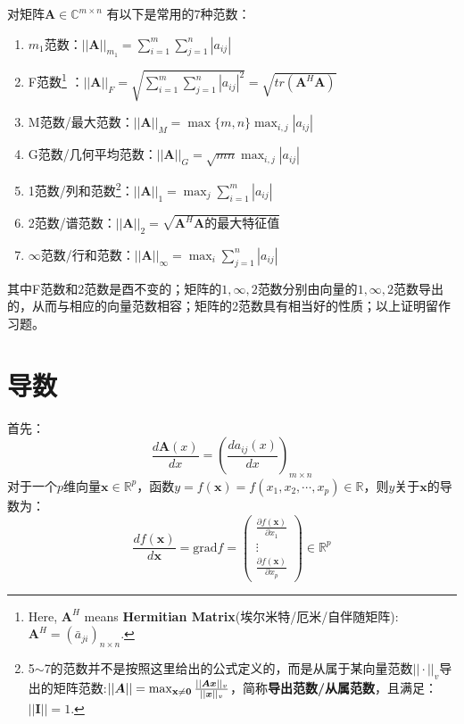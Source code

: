 \documentclass[11pt,fleqn, UTF8]{ctexbook} %
\begin{document}
对矩阵$\boldsymbol{A}\in \mathbb{C}^{m\times n}$ 有以下是常用的7种范数：
\begin{enumerate}
  \item $m_1$范数：$||\boldsymbol{A}||_{m_1}=\sum_{i=1}^{m}\sum_{j=1}^{n}|a_{ij}|$
  \item F范数\footnote{
  Here, $\boldsymbol{A}^H$ means \textbf{Hermitian Matrix}(埃尔米特/厄米/自伴随矩阵): $\boldsymbol{A}^H=(\bar{a}_{ji})_{n\times n}$.
  }
  ：$||\boldsymbol{A}||_F=\sqrt{\sum_{i=1}^{m}\sum_{j=1}^{n}|a_{ij}|^2}=\sqrt{tr(\boldsymbol{A}^H\boldsymbol{A})}$
  \item M范数/最大范数：$||\boldsymbol{A}||_M=\max\{m,n\}\max_{i,j}|a_{ij}|$
  \item G范数/几何平均范数：$||\boldsymbol{A}||_G=\sqrt{mn}\max_{i,j}|a_{ij}|$
  \item 1范数/列和范数\footnote{
  5$\sim$7的范数并不是按照这里给出的公式定义的，而是从属于某向量范数$||\cdot||_v$导出的矩阵范数:$||\boldsymbol{A}||=\max_{\bf{x}\neq\bf{0}}\frac{||\boldsymbol{Ax}||_v}{||\boldsymbol{x}||_v}$，简称\textbf{导出范数/从属范数}，且满足：$||\boldsymbol{I}||=1$.
  }：$||\boldsymbol{A}||_1=\max_{j}\sum_{i=1}^m|a_{ij}|$
  \item 2范数/谱范数：$||\boldsymbol{A}||_2=\sqrt{\boldsymbol{A}^H\boldsymbol{A}\text{的最大特征值}}$
  \item $\infty$范数/行和范数：$||\boldsymbol{A}||_{\infty}=\max_{i}\sum_{j=1}^n|a_{ij}|$
\end{enumerate}
其中F范数和2范数是酉不变的；矩阵的$1,\infty,2$范数分别由向量的$1,\infty,2$范数导出的，从而与相应的向量范数相容；矩阵的2范数具有相当好的性质；以上证明留作习题。

\section{导数}
首先：
\begin{equation}\label{div}
  \frac{d \boldsymbol{A}(x)}{dx}=(\frac{d a_{ij}(x)}{dx})_{m\times n}
\end{equation}
对于一个$p$维向量$\boldsymbol{x}\in \mathbb{R}^p$，函数$y=f(\boldsymbol{x})=f(x_1,x_2,\cdots,x_p)\in\mathbb{R}$，则$y$关于$\boldsymbol{x}$的导数为：
\begin{equation}\label{2.9}
  \frac{df(\boldsymbol{x})}{d\boldsymbol{x}}=\text{grad}f=\begin{pmatrix}\frac{\partial f(\boldsymbol{x})}{\partial x_1}\\ \vdots\\ \frac{\partial f(\boldsymbol{x})}{\partial x_p}\end{pmatrix}\in\mathbb{R}^p
\end{equation}
\end{document}
